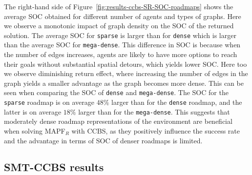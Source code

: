 \documentclass[review]{elsarticle}
\newcommand{\ccbs}{\ac{CCBS}\xspace}
\newcommand{\mapfr}{\ac{MAPF}$_R$\xspace}
\newcommand{\smtccbs}{SMT-CCBS\xspace}
\begin{document}
The right-hand side of Figure~\ref{fig:results-ccbs-SR-SOC-roadmaps} shows the average SOC obtained for different number of agents and types of graphs. Here we observe a monotonic impact of graph density on the SOC of the returned solution. The average SOC for \texttt{sparse} is larger than for \texttt{dense} which is larger than the average SOC for \texttt{mega-dense}. 
This difference in SOC is because %
when the number of edges increases, agents are likely to have more options to reach their goals without substantial spatial detours, which yields lower SOC. 
Here too we observe diminishing return effect, where increasing the number of edges in the graph yields a smaller advantage as the graph becomes more dense. This can be seen when comparing the SOC of \texttt{dense} and \texttt{mega-dense}.
The SOC for the \texttt{sparse} roadmap is on average $48\%$ larger than for the \texttt{dense} roadmap, and the latter is on average $18\%$ larger than for the \texttt{mega-dense}.
This suggests that moderately dense roadmap representations of the environment are beneficial when solving \mapfr with \ccbs, as they positively influence the success rate and the advantage in terms of SOC of denser roadmaps is limited.

\subsection{\smtccbs results}
\end{document}
